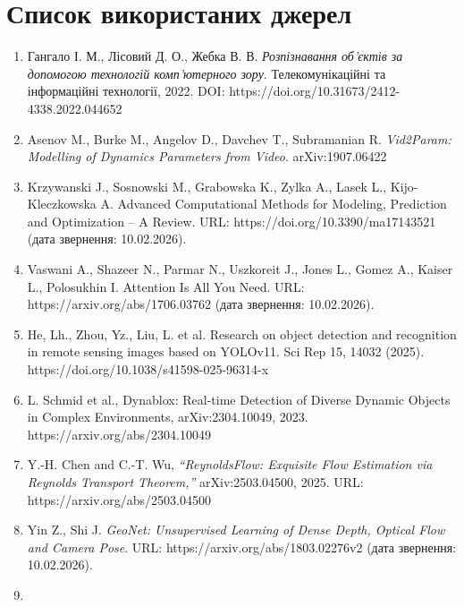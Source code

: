 \documentclass[
]{article}
\begin{document}
\section{\texorpdfstring{\hfill\break
Список використаних джерел}{ Список використаних джерел}}\label{ux441ux43fux438ux441ux43eux43a-ux432ux438ux43aux43eux440ux438ux441ux442ux430ux43dux438ux445-ux434ux436ux435ux440ux435ux43b}

\begin{enumerate}
\def\labelenumi{\arabic{enumi}.}
\item
  \protect{}\label{_Ref221440208}{}Гангало І. М., Лісовий Д. О., Жебка В. В. \emph{Розпізнавання об'єктів за допомогою технологій комп'ютерного зору}. Телекомунікаційні та інформаційні технології, 2022. DOI: https://doi.org/10.31673/2412-4338.2022.044652
\item
  Asenov M., Burke M., Angelov D., Davchev T., Subramanian R. \emph{Vid2Param: Modelling of Dynamics Parameters from Video}. arXiv:1907.06422
\item
  Krzywanski J., Sosnowski M., Grabowska K., Zylka A., Lasek L., Kijo-Kleczkowska A. Advanced Computational Methods for Modeling, Prediction and Optimization -- A Review. URL: https://doi.org/10.3390/ma17143521 (дата звернення: 10.02.2026).
\item
  Vaswani A., Shazeer N., Parmar N., Uszkoreit J., Jones L., Gomez A., Kaiser L., Polosukhin I. Attention Is All You Need. URL: https://arxiv.org/abs/1706.03762 (дата звернення: 10.02.2026).
\item
  \protect{}\label{_Ref221441123}{}He, Lh., Zhou, Yz., Liu, L. et al. Research on object detection and recognition in remote sensing images based on YOLOv11. Sci Rep 15, 14032 (2025). https://doi.org/10.1038/s41598-025-96314-x\protect{}\label{_Ref221397736}{}
\item
  L. Schmid et al., Dynablox: Real-time Detection of Diverse Dynamic Objects in Complex Environments, arXiv:2304.10049, 2023. https://arxiv.org/abs/2304.10049
\item
  \protect{}\label{_Ref221441630}{}Y.-H. Chen and C.-T. Wu, \emph{``ReynoldsFlow: Exquisite Flow Estimation via Reynolds Transport Theorem,''} arXiv:2503.04500, 2025. URL: https://arxiv.org/abs/2503.04500
\item
  Yin Z., Shi J. \emph{GeoNet: Unsupervised Learning of Dense Depth, Optical Flow and Camera Pose}. URL: https://arxiv.org/abs/1803.02276v2 (дата звернення: 10.02.2026).
\item

\end{enumerate}
\end{document}

